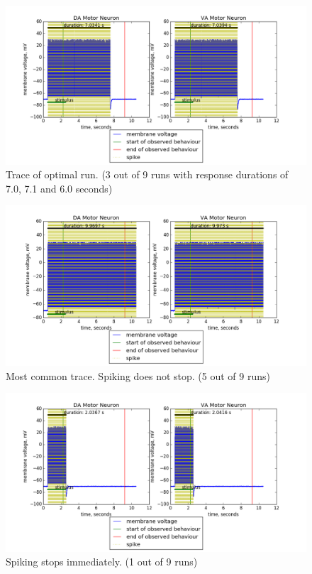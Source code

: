 \begin{figure}[H]
\includegraphics[width=\linewidth]{perfect}
\caption{Trace of optimal run. (3 out of 9 runs with response durations of 7.0, 7.1 and 6.0 seconds)}
\label{fig:optimalRun}
\end{figure}
\begin{figure}[H]
\includegraphics[width=\linewidth]{noStop}
\caption{Most common trace. Spiking does not stop. (5 out of 9 runs)}
\label{fig:noStop}
\end{figure}
\begin{figure}[H]
\includegraphics[width=\linewidth]{imideateStop}
\caption{Spiking stops immediately. (1 out of 9 runs)}
\label{fig:imideateStop}
\end{figure}

